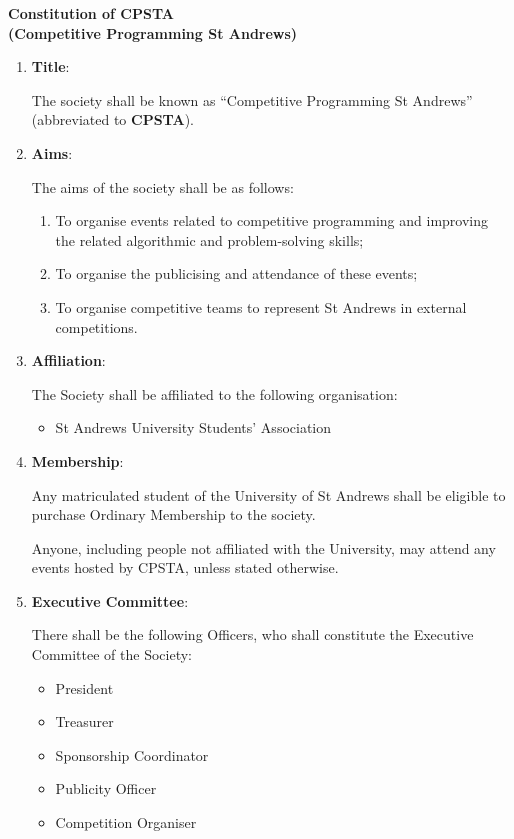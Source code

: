 \documentclass[11pt]{article}
\begin{document}
\begin{center}
\textbf{Constitution of CPSTA\\ (Competitive Programming St Andrews)}
\end{center}

\begin{enumerate}[label = \Roman*.]

\item \textbf{Title}: 

The society shall be known as “Competitive Programming St Andrews” (abbreviated to \textbf{CPSTA}).

\item \textbf{Aims}: 

The aims of the society shall be as follows:
    \begin{enumerate}[label = \arabic*.]
    \item To organise events related to competitive programming and improving the related algorithmic and problem-solving skills;
    \item To organise the publicising and attendance of these events;
    \item To organise competitive teams to represent St Andrews in external competitions.
    \end{enumerate}

\item \textbf{Affiliation}:

The Society shall be affiliated to the following organisation:

\begin{itemize}
    \item St Andrews University Students' Association
\end{itemize}

\item \textbf{Membership}: 

Any matriculated student of the University of St Andrews shall be eligible to purchase Ordinary Membership to the society.

Anyone, including people not affiliated with the University, may attend any events hosted by CPSTA, unless stated otherwise.

\item \textbf{Executive Committee}: 

There shall be the following Officers, who shall constitute the Executive Committee of the Society:

\begin{itemize}
\item President
\item Treasurer
\item Sponsorship Coordinator 
\item Publicity Officer
\item Competition Organiser
\end{itemize}


\end{enumerate}
\end{document}
